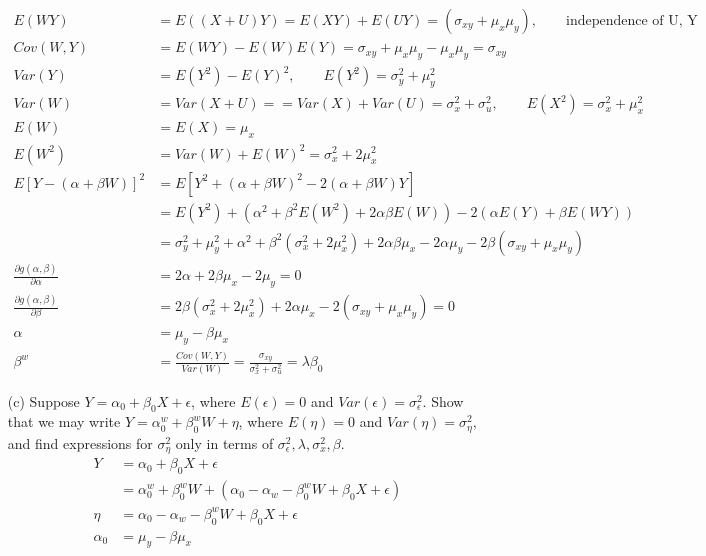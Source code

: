 \begin{itemize}
    \begin{align*}
    E(WY) &= E((X+U)Y) = E(XY) + E(UY) = (\sigma_{xy} + \mu_x\mu_y), \qquad \text{independence of U, Y}\\
    Cov(W,Y) &= E(WY) - E(W)E(Y) = \sigma_{xy} + \mu_x\mu_y - \mu_x\mu_y =\sigma_{xy} \\
    Var(Y) &= E(Y^2) - E(Y)^2, \qquad E(Y^2) = \sigma_y^2 + \mu_y^2\\
    Var(W) &= Var(X+U) = = Var(X) + Var(U) = \sigma_x^2 + \sigma_u^2, \qquad E(X^2) = \sigma_x^2 + \mu_x^2\\
    E(W) &= E(X) = \mu_x\\
    E(W^2) &= Var(W) + E(W)^2 = \sigma_x^2 + 2\mu_x^2 \\
     E[Y-(\alpha + \beta W)]^2 &= E[Y^2 + (\alpha + \beta W)^2 -2(\alpha + \beta W)Y ]\\
     &= E(Y^2) + (\alpha^2 + \beta^2 E(W^2) + 2\alpha\beta E(W)) - 2(\alpha E(Y) + \beta E(WY))\\
     &= \sigma_y^2+\mu_y^2 + \alpha^2 + \beta^2 (\sigma_x^2 + 2\mu_x^2) + 2\alpha\beta \mu_x -2\alpha \mu_y -2 \beta (\sigma_{xy}+ \mu_x\mu_y)\\
     \frac{\partial g(\alpha,\beta)}{\partial \alpha} &= 2\alpha + 2\beta \mu_x - 2\mu_y = 0\\
     \frac{\partial g(\alpha,\beta)}{\partial \beta} &=2\beta (\sigma_x^2 + 2\mu_x^2) + 2\alpha \mu_x -2(\sigma_{xy}+\mu_x\mu_y) = 0\\
     \alpha &= \mu_y - \beta \mu_x\\
     \beta^w &= \frac{Cov(W,Y)}{Var(W)} = \frac{\sigma_{xy}}{\sigma_x^2 + \sigma_u^2} = \lambda \beta_0
    \end{align*} 
    \item[(c)] Suppose $Y=\alpha_0 + \beta_0 X + \epsilon$, where $E(\epsilon) = 0$ and $Var(\epsilon) = \sigma_\epsilon^2$. Show that we may write $Y=\alpha_0^w + \beta_0^w W + \eta$, where $E(\eta) = 0$ and $Var(\eta) = \sigma_\eta^2$, and find expressions for $\sigma_\eta^2$ only in terms of $\sigma_\epsilon^2, \lambda, \sigma_x^2, \beta$.\\
    \begin{align*}
    Y &=\alpha_0 + \beta_0 X + \epsilon\\
    &= \alpha_0^w + \beta_0^w W + (\alpha_0 - \alpha_w - \beta_0^w W + \beta_0 X + \epsilon)\\
    \eta &= \alpha_0 - \alpha_w - \beta_0^w W + \beta_0 X + \epsilon\\
    \alpha_0 &= \mu_y - \beta \mu_x\\

\end{align*}
\end{itemize}
